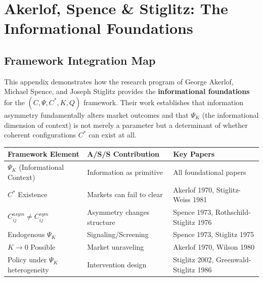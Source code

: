 \section{Akerlof, Spence \& Stiglitz: The Informational Foundations}
\label{app:information-economics}

\subsection{Framework Integration Map}

This appendix demonstrates how the research program of George Akerlof, Michael Spence, 
and Joseph Stiglitz provides the \textbf{informational foundations} for the 
$(C, \Psi, C^*, K, Q)$ framework. Their work establishes that information asymmetry 
fundamentally alters market outcomes and that $\Psi_K$ (the informational dimension 
of context) is not merely a parameter but a determinant of whether coherent 
configurations $C^*$ can exist at all.

\begin{center}
\renewcommand{\arraystretch}{1.4}
\begin{tabular}{|l|l|l|}
\hline
\textbf{Framework Element} & \textbf{A/S/S Contribution} & \textbf{Key Papers} \\
\hline
$\Psi_K$ (Informational Context) & Information as primitive & All foundational papers \\
$C^*$ Existence & Markets can fail to clear & Akerlof 1970, Stiglitz-Weiss 1981 \\
$C_{ij}^{asym} \neq C_{ij}^{sym}$ & Asymmetry changes structure & Spence 1973, Rothschild-Stiglitz 1976 \\
Endogenous $\Psi_K$ & Signaling/Screening & Spence 1973, Stiglitz 1975 \\
$K \to 0$ Possible & Market unraveling & Akerlof 1970, Wilson 1980 \\
Policy under $\Psi_K$ heterogeneity & Intervention design & Stiglitz 2002, Greenwald-Stiglitz 1986 \\
\hline
\end{tabular}
\end{center}

